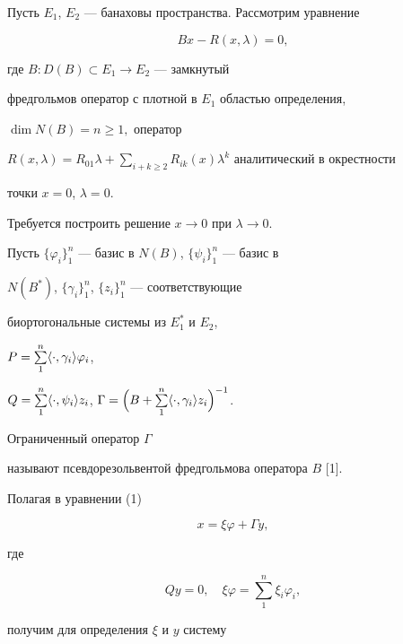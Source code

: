 Пусть $E_1$, $E_2$ --- банаховы пространства. Рассмотрим уравнение


\begin{equation}


Bx - R(x,\lambda) = 0,


\end{equation}


где $B: D(B)\subset E_1\rightarrow E_2$ --- замкнутый


фредгольмов оператор с плотной в $E_1$ областью определения,


$\dim N(B) = n \ge 1,$ оператор


$R(x,\lambda) = R_{01}\lambda +


\sum\limits_{i+k\ge 2}R_{ik}(x)\lambda^k$ аналитический в окрестности


точки $x=0$, $\lambda =0$.


Требуется построить решение  $x\rightarrow 0$ при $\lambda


\rightarrow 0$.





Пусть $\{\varphi_i\}^n_1$ --- базис в $N(B)$, $\{\psi_i\}^n_1$ --- базис в


$N(B^*)$, $\{\gamma_i\}^n_1$, $\{z_i\}^n_1$ --- соответствующие


биортогональные системы из $E^*_1$ и $E_2$,


$P = \sum\limits_1^n\langle\cdot,\gamma_i\rangle\varphi_i$,


$Q = \sum\limits_1^n\la\cdot,\psi_i\ra z_i$, $\Gamma = \Big(B +


\sum\limits_1^n\la\cdot,\gamma_i\ra z_i\Big)^{-1}$.


Ограниченный оператор $\Gamma$


называют псевдорезольвентой фредгольмова оператора $B$ [1].





Полагая в уравнении (1)


\begin{equation}


x = \xi\varphi + \Gamma y,


\end{equation}


где


$$


Qy = 0, \quad \xi\varphi = \sum^n_1\xi_i\varphi_i,


$$


получим для определения $\xi$ и $y$ систему


